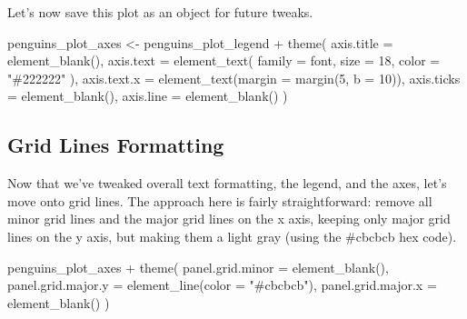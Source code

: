 \documentclass[
]{book}
\newenvironment{Shaded}{\begin{snugshade}}{\end{snugshade}}
\newcommand{\AttributeTok}[1]{\textcolor[rgb]{0.77,0.63,0.00}{#1}}
\newcommand{\DecValTok}[1]{\textcolor[rgb]{0.00,0.00,0.81}{#1}}
\newcommand{\FunctionTok}[1]{\textcolor[rgb]{0.00,0.00,0.00}{#1}}
\newcommand{\NormalTok}[1]{#1}
\newcommand{\OtherTok}[1]{\textcolor[rgb]{0.56,0.35,0.01}{#1}}
\newcommand{\SpecialCharTok}[1]{\textcolor[rgb]{0.00,0.00,0.00}{#1}}
\newcommand{\StringTok}[1]{\textcolor[rgb]{0.31,0.60,0.02}{#1}}
\begin{document}
Let's now save this plot as an object for future tweaks.

\begin{Shaded}
\begin{Highlighting}[]
\NormalTok{penguins\_plot\_axes }\OtherTok{\textless{}{-}}\NormalTok{ penguins\_plot\_legend }\SpecialCharTok{+}
  \FunctionTok{theme}\NormalTok{(}
    \AttributeTok{axis.title =} \FunctionTok{element\_blank}\NormalTok{(),}
    \AttributeTok{axis.text =} \FunctionTok{element\_text}\NormalTok{(}
      \AttributeTok{family =}\NormalTok{ font,}
      \AttributeTok{size =} \DecValTok{18}\NormalTok{,}
      \AttributeTok{color =} \StringTok{"\#222222"}
\NormalTok{    ),}
    \AttributeTok{axis.text.x =} \FunctionTok{element\_text}\NormalTok{(}\AttributeTok{margin =} \FunctionTok{margin}\NormalTok{(}\DecValTok{5}\NormalTok{, }\AttributeTok{b =} \DecValTok{10}\NormalTok{)),}
    \AttributeTok{axis.ticks =} \FunctionTok{element\_blank}\NormalTok{(),}
    \AttributeTok{axis.line =} \FunctionTok{element\_blank}\NormalTok{()}
\NormalTok{  )}
\end{Highlighting}
\end{Shaded}

\hypertarget{grid-lines-formatting}{%
\subsection*{Grid Lines Formatting}\label{grid-lines-formatting}}

Now that we've tweaked overall text formatting, the legend, and the axes, let's move onto grid lines. The approach here is fairly straightforward: remove all minor grid lines and the major grid lines on the x axis, keeping only major grid lines on the y axis, but making them a light gray (using the \#cbcbcb hex code).

\begin{Shaded}
\begin{Highlighting}[]
\NormalTok{penguins\_plot\_axes }\SpecialCharTok{+}
  \FunctionTok{theme}\NormalTok{(}
    \AttributeTok{panel.grid.minor =} \FunctionTok{element\_blank}\NormalTok{(),}
    \AttributeTok{panel.grid.major.y =} \FunctionTok{element\_line}\NormalTok{(}\AttributeTok{color =} \StringTok{"\#cbcbcb"}\NormalTok{),}
    \AttributeTok{panel.grid.major.x =} \FunctionTok{element\_blank}\NormalTok{()}
\NormalTok{  )}
\end{Highlighting}
\end{Shaded}
\end{document}
